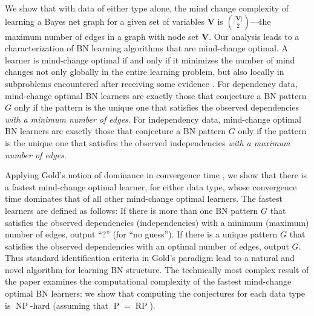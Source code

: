 \documentclass{elsarticle}%
\DeclareMathOperator{\Poly}{\mathbf{\mathrm{P}}}
\DeclareMathOperator{\RP}{\mathbf{\mathrm{RP}}}
\DeclareMathOperator{\NP}{\mathbf{\mathrm{NP}}}
\begin{document}
We show that with data of either type alone, the mind change complexity of learning a Bayes net graph for a given set of variables $\mathbf{V}$ is ${\binom{|\mathbf{V}|}{2}}$---the maximum number of edges in a graph
with node set $\mathbf{V}$. Our analysis leads to a characterization of BN learning algorithms that are mind-change optimal.
A learner is mind-change optimal if and only if it minimizes the number of
mind changes not only globally in the entire learning problem,
but also locally in subproblems encountered after receiving some evidence \cite{luo05:_mind_chang_effic_learn,luo06:_mind_chang_effic_learn}. %
  For dependency data, mind-change optimal BN learners are exactly those that 
conjecture a BN pattern $G$ only if the pattern is the unique one that satisfies the observed dependencies {\em with a minimum number of edges}. For independency data, mind-change optimal BN learners are exactly those that 
conjecture a BN pattern $G$ only if the pattern is the unique one that satisfies the observed independencies {\em with a maximum number of edges}. 


Applying Gold's notion of dominance in convergence time \cite[p.462]{gold67limit}, we show that there is a fastest mind-change optimal learner, for either data type, whose convergence time dominates that of all other mind-change optimal learners. The fastest learners are defined as follows: If there is more than one BN pattern $G$ that satisfies the observed dependencies (independencies) with a minimum (maximum) number of edges, output ``?''
(for ``no guess''). If there is  a unique pattern $G$ that satisfies the observed dependencies with an optimal number of edges, output $G$. Thus standard identification criteria in Gold's paradigm lead to a natural and novel algorithm for learning BN structure.
The technically most complex result of the paper examines the computational complexity of the fastest mind-change optimal BN learners: we show that computing the conjectures for each data type is $\NP$-hard (assuming that $\Poly = \RP$).
\end{document}

